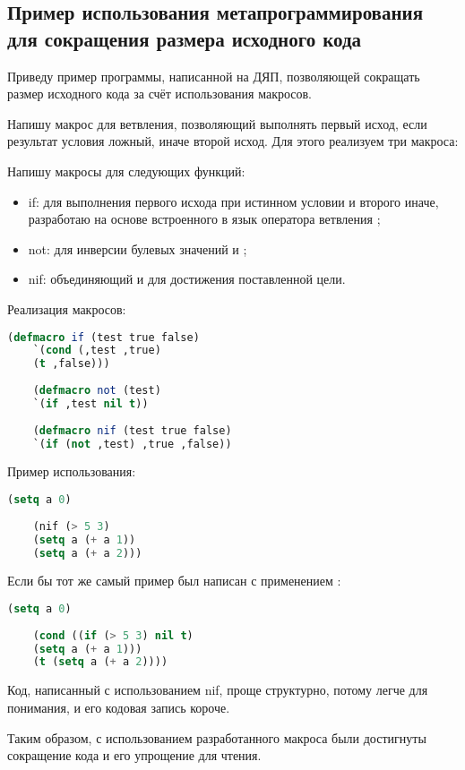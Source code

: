 \subsection{Пример использования метапрограммирования для сокращения размера исходного кода}

Приведу пример программы, написанной на ДЯП, позволяющей сокращать размер исходного кода за счёт использования макросов.

Напишу макрос для ветвления, позволяющий выполнять первый исход, если результат условия ложный, иначе второй исход. Для этого реализуем три макроса:

Напишу макросы для следующих функций:
\begin{itemize}
	\item if: для выполнения первого исхода при истинном условии и второго иначе, разработаю на основе встроенного в язык оператора ветвления ;
	\item not: для инверсии булевых значений  и ;
	\item nif: объединяющий  и  для достижения поставленной цели.
\end{itemize}

Реализация макросов:
\begin{lstlisting}[language=Lisp, frame=none]
	(defmacro if (test true false)
	`(cond (,test ,true)
	(t ,false)))
	
	(defmacro not (test)
	`(if ,test nil t))
	
	(defmacro nif (test true false)
	`(if (not ,test) ,true ,false))
\end{lstlisting}

Пример использования:
\begin{lstlisting}[language=Lisp, frame=none]
	(setq a 0)
	
	(nif (> 5 3)
	(setq a (+ a 1))
	(setq a (+ a 2)))
\end{lstlisting}

Если бы тот же самый пример был написан с применением :
\begin{lstlisting}[language=Lisp, frame=none]
	(setq a 0)
	
	(cond ((if (> 5 3) nil t)
	(setq a (+ a 1)))
	(t (setq a (+ a 2))))
\end{lstlisting}

Код, написанный с использованием nif, проще структурно, потому легче для понимания, и его кодовая запись короче.

Таким образом, с использованием разработанного макроса  были достигнуты сокращение кода и его упрощение для чтения.

